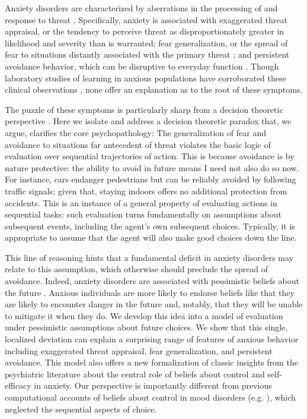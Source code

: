 \documentclass[11pt]{article} %
\begin{document}
Anxiety disorders are characterized by aberrations in the processing of and response to threat \citep{dsm5, ClarkBeck2011}. Specifically, anxiety is associated with exaggerated threat appraisal, or the tendency to perceive threat as disproportionately greater in likelihood and severity than is warranted; fear generalization, or the spread of fear to situations distantly associated with the primary threat \citep{dymond2015}; and persistent avoidance behavior, which can be disruptive to everyday function \citep{Arnaudova2017}. Though laboratory studies of learning in anxious populations have corroborated these clinical observations \citep{Harle2017, norbury2018, Aylward2019}, none offer an explanation as to the root of these symptoms.

The puzzle of these symptoms is particularly sharp from a decision theoretic perspective \citep{huys2015}. Here we isolate and address a  decision theoretic paradox that, we argue, clarifies the core psychopathology: The generalization of fear and avoidance to situations far antecedent of threat violates the basic logic of evaluation over sequential trajectories of action. This is because avoidance is by nature protective: the ability to avoid in future means I need not also do so now. For instance, cars endanger pedestrians but can be reliably avoided by following traffic signals; given that, staying indoors offers no additional protection from accidents. This is an instance of a general property of evaluating actions in sequential tasks: such evaluation turns fundamentally on assumptions about subsequent events, including the agent's own subsequent choices. Typically, it is appropriate to assume that the agent will also make good choices down the line. 

This line of reasoning hints that a fundamental deficit in anxiety disorders may relate to this assumption, which otherwise should preclude the spread of avoidance. Indeed, anxiety disorders are associated with pessimistic beliefs about the future \citep{ClarkBeck2011}. Anxious individuals are more likely to endorse beliefs like that they are likely to encounter danger in the future and, notably, that they will be unable to mitigate it when they do. We develop this idea into a model of evaluation under pessimistic assumptions about future choices. We show that this single, localized deviation can explain a surprising range of features of anxious behavior including exaggerated threat appraisal, fear generalization, and persistent avoidance. This model also offers a new formalization of classic insights from the psychiatric literature about the central role of beliefs about control and self-efficacy in anxiety. Our perspective is importantly different from previous computational accounts of beliefs about control in mood disorders (e.g. \cite{HuysDayan2009}), which neglected the sequential aspects of choice. 
\end{document}
